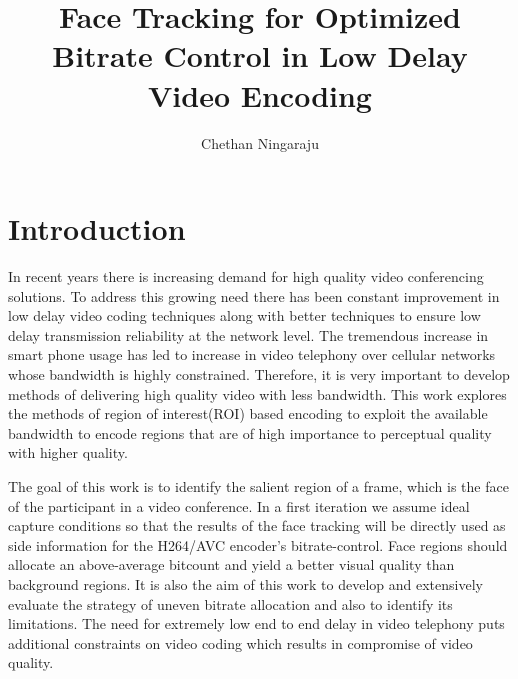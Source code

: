 \documentclass[11pt]{article} %
\title{Face Tracking for Optimized Bitrate Control in Low Delay Video Encoding}
\author{Chethan Ningaraju}
\begin{document}
\maketitle
\clearpage
\tableofcontents
\clearpage
\section{Introduction}
	In recent years there is increasing demand for high quality video conferencing solutions. To address this growing need there has been constant improvement in  low delay video coding techniques along with better techniques to ensure low delay transmission reliability at the network level. The tremendous increase in smart phone usage has led to increase in video telephony over cellular networks whose bandwidth is highly constrained. Therefore, it is very important to develop methods of delivering high quality video with less bandwidth. This work explores the methods of region of interest(ROI) based encoding to exploit the available bandwidth to encode regions that are of high importance to perceptual quality with higher quality. 

The goal of this work is to identify the salient region of a frame, which is the face of the participant in a video conference. In a first iteration we assume ideal capture conditions so that the results of the face tracking will be directly used as side information for the H264/AVC encoder's bitrate-control. Face regions should allocate an above-average bitcount and yield a better visual quality than background regions. It is also the aim of this work to develop and extensively evaluate the strategy of uneven bitrate allocation and also to identify its limitations.
The need for extremely low end to end delay in video telephony puts additional constraints on video coding which results in compromise of video quality.
\end{document}
